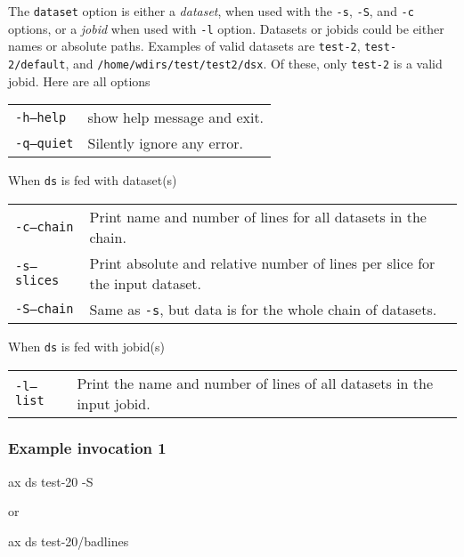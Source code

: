 The \texttt{dataset} option is either a \textsl{dataset}, when used
with the \texttt{-s}, \texttt{-S}, and \texttt{-c} options, or a
\textsl{jobid} when used with \texttt{-l} option.  Datasets or jobids
could be either names or absolute paths.  Examples of valid datasets
are \texttt{test-2}, \texttt{test-2/default}, and
\texttt{/home/wdirs/test/test2/dsx}.  Of these, only \texttt{test-2}
is a valid jobid.
Here are all options
\begin{snugshade}
\begin{tabular}{p{4cm}p{9cm}}
  \texttt{-h}\hspace{3cm}\texttt{---help} & show help message and exit.\\[4ex]
  \texttt{-q}\hspace{3cm}\texttt{---quiet} & Silently ignore any error.\\
\end{tabular}
\end{snugshade}
When \texttt{ds} is fed with dataset(s)
\begin{snugshade}
\begin{tabular}{p{4cm}p{9cm}}
  \texttt{-c}\hspace{3cm}\texttt{---chain} & Print name and number of
  lines for all datasets in the chain.\\[4ex]
  \texttt{-s}\hspace{3cm}\texttt{---slices} & Print absolute and
  relative number of lines per slice for the input dataset.\\[2ex]
  \texttt{-S}\hspace{3cm}\texttt{---chain} & Same as \texttt{-s}, but
  data is for the whole chain of datasets.\\
\end{tabular}
\end{snugshade}
When \texttt{ds} is fed with jobid(s)
\begin{snugshade}
\begin{tabular}{p{4cm}p{9cm}}
  \texttt{-l}\hspace{3cm}\texttt{---list} & Print the name and number
  of lines of all datasets in the input jobid.\\
\end{tabular}
\end{snugshade}

\subsubsection*{Example invocation 1}
\begin{shell}
ax ds test-20 -S
\end{shell}
or
\begin{shell}
ax ds test-20/badlines
\end{shell}

